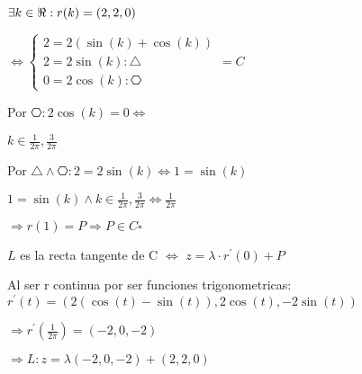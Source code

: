 \documentclass[../parcial.tex]{subfiles}
\begin{document}
\begin{enumerate}
            $\exists k \in \real : r(k) = (2,2,0)$

            $\Leftrightarrow \left\{
                \begin{array}{ll}
                    2 = 2(\sin(k) + \cos(k)) \\
                    2 = 2\sin(k) : \triangle\\
                    0 = 2\cos(k) : \hexagon
                \end{array}
            \right. = C$

            Por $\hexagon: 2\cos(k) = 0 \Leftrightarrow $

            $ k \in {\frac{1}{2\pi},\frac{3}{2\pi}} $

            Por $ \triangle \wedge \hexagon: 2 = 2\sin(k) \Leftrightarrow 1 = \sin(k) $

            $ 1 = \sin(k) \wedge k \in {\frac{1}{2\pi},\frac{3}{2\pi}} \Leftrightarrow \frac{1}{2\pi} $

            $\Rightarrow r(1) = P \Rightarrow P \in  C \square$

            $ L $ es la recta tangente de C $\Leftrightarrow $ $z = \lambda \cdot r^\prime(0) + P$

            Al ser r continua por ser funciones trigonometricas: 
            $ r^\prime(t) = (2(\cos(t)-\sin(t)), 2\cos(t), -2\sin(t)) $

            $ \Rightarrow r^\prime(\frac{1}{2\pi}) = (-2, 0, -2) $

            $\Rightarrow L : z = \lambda(-2,0,-2) + (2,2,0) $

    \end{enumerate}
\end{document}
